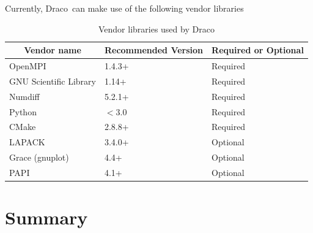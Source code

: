 \documentclass[note]{newmemo}
\newcommand{\draco}{{\normalfont\small\sffamily Draco}}
\begin{document}
Currently, \draco\ can make use of the following vendor libraries
%
\begin{table}[ht]
  \caption{Vendor libraries used by \draco}
  \label{tab:vendors}
\begin{center}
\begin{tabular}{lll} \hline\hline
\multicolumn{1}{c}{Vendor name} & 
\multicolumn{1}{c}{Recommended Version} & 
\multicolumn{1}{c}{Required or Optional} \\ \hline
OpenMPI                & 1.4.3+ & Required \\
GNU Scientific Library & 1.14+  & Required \\
Numdiff                & 5.2.1+ & Required \\
Python                 & $<$3.0 & Required \\
CMake                  & 2.8.8+ & Required \\
LAPACK                 & 3.4.0+ & Optional \\
Grace (gnuplot)        & 4.4+   & Optional \\
PAPI                   & 4.1+   & Optional \\
\hline\hline
\end{tabular}
\end{center}
\end{table}





\section{Summary}
\label{sec:summary}
\end{document}

